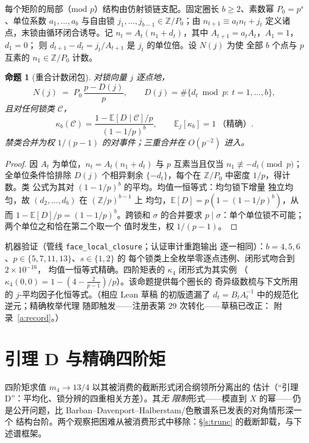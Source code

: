\documentclass[11pt]{article}
\numberwithin{equation}{section}
\newtheorem{proposition}[theorem]{命题}
\theoremstyle{definition}
\theoremstyle{remark}
\begin{document}
每个矩阶的局部（mod $p$）结构由仿射锁链支配。固定圈长
$b\ge2$、素数幂 $P_0=p^{s}$、单位系数 $a_1,\dots,a_b$ 与自由锁
$j_1,\dots,j_{b-1}\in\mathbb Z/P_0$；由 $n_{t+1}\equiv
a_tn_t+j_t$ 定义诸点，末锁由循环闭合诱导。记
$n_t=A_t(n_1+d_t)$，其中 $A_{t+1}=a_tA_t$，$A_1=1$，$d_1=0$；
则 $d_{t+1}-d_t=j_t/A_{t+1}$ 是 $j_t$ 的单位倍。设 $N(j)$ 为使
全部 $b$ 个点与 $p$ 互素的 $n_1\in\mathbb Z/P_0$ 计数。

\begin{proposition}[重合计数闭包]\label{p:local}
对锁向量 $j$ 逐点地，
\[
N(j)\;=\;P_0\,\frac{p-D(j)}{p},
\qquad
D(j)=\#\{d_t\bmod p:\ t=1,\dots,b\},
\]
且对任何锁类 $\mathcal C$，
\[
\kappa_b(\mathcal C)
=\frac{1-\mathbb E[D\mid\mathcal C]/p}{(1-1/p)^{b}},
\qquad
\mathbb E_j[\kappa_b]=1\ \text{（精确）}.
\]
禁类合并为权 $1/(p-1)$ 的对事件；三重合并在 $O(p^{-2})$ 进入。
\end{proposition}

\begin{proof}
因 $A_t$ 为单位，$n_t=A_t(n_1+d_t)$ 与 $p$ 互素当且仅当
$n_1\not\equiv-d_t\pmod p$；全单位条件恰排除 $D(j)$ 个相异剩余
$\{-d_t\}$，每个在 $\mathbb Z/P_0$ 中密度 $1/p$，得计数。类
公式为其对 $(1-1/p)^{b}$ 的平均。均值一恒等式：均匀锁下增量
独立均匀，故 $(d_2,\dots,d_b)$ 在 $(\mathbb Z/p)^{b-1}$ 上
均匀，$\mathbb E[D]=p(1-(1-1/p)^{b})$，从而
$1-\mathbb E[D]/p=(1-1/p)^{b}$。跨锁和 $\sigma$ 的合并要求
$p\mid\sigma$：单个单位锁不可能；两个单位之和恰在第二个取一个
值时发生，权 $1/(p-1)$。
\end{proof}

机器验证（管线 \texttt{face\_local\_closure}；认证审计重跑输出
逐一相同）：$b=4,5,6$、$p\in\{5,7,11,13\}$、$s\in\{1,2\}$ 的
每个锁类上全枚举零逐点违例、闭形式吻合到 $2\times10^{-16}$，
均值一恒等式精确。四阶矩表的 $\kappa_4$ 闭形式为其实例
（$\kappa_4(0,0)=1-(4-\tfrac2{p-1})/p$）。该命题提供每个圈长的
奇异级数梳与下文所用的 $j$-平均因子化恒等式。（相应 Lean 草稿
的初版遗漏了 $d_t=B_tA_t^{-1}$ 中的规范化逆元；精确枚举代理
随即触发——注册表第 $29$ 次转化——草稿已改正：
附录~\ref{a:record}。）

\section{引理 D 与精确四阶矩}\label{s:four}

四阶矩求值 $m_4\to13/4$ 以其被消费的截断形式闭合纲领所分离出的
估计（``引理 D''：平均化、锁分辨的四重相关方差）。其\emph{无
限制}形式——模直到 $X$ 的幂——仍是公开问题，比
Barban--Davenport--Halberstam/色散谱系已发表的对角情形深一个
结构台阶。两个观察把困难从被消费形式中移除：\S\ref{s:trunc}
的截断卸载，与下述谱框架。
\end{document}
